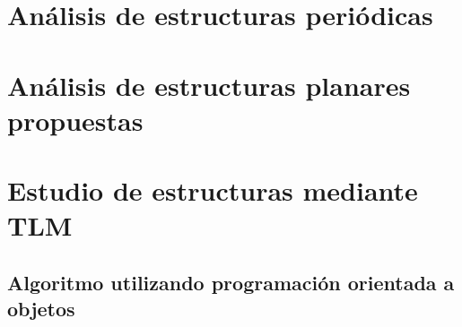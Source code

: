 
\section{Análisis de estructuras periódicas}
\label{sec_estructuras_periodicas}
\section{Análisis de estructuras planares propuestas}
\label{sec_estructuras_propuestas}
\section{Estudio de estructuras mediante TLM}
\label{sec_estudio_tlm}

\subsection{Algoritmo utilizando programación orientada a objetos}
\label{subsec_estudio_tlm}
